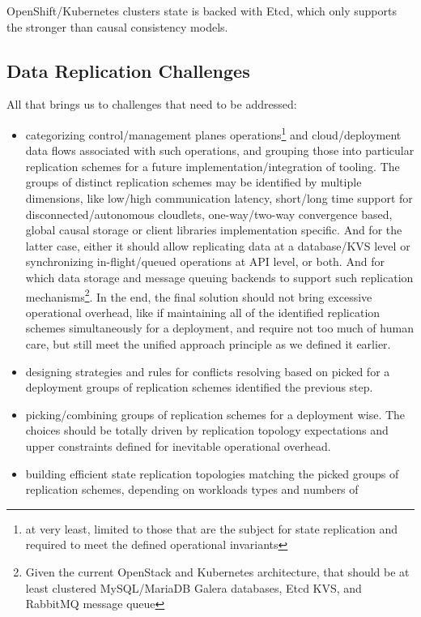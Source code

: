 \documentclass[conference]{IEEEtran}
\begin{document}
OpenShift/Kubernetes clusters state is backed with Etcd, which only supports
the stronger than causal consistency models.

\subsection{Data Replication Challenges}

All that brings us to challenges that need to be addressed:
\begin{itemize}
  \item categorizing control/management planes operations\footnote{at very
    least, limited to those that are the subject for state replication and
    required to meet the defined operational invariants} and cloud/deployment
    data flows associated with such operations, and grouping those into
    particular replication schemes for a future implementation/integration of
    tooling. The groups of distinct replication schemes may be identified by
    multiple dimensions, like low/high communication latency, short/long time
    support for disconnected/autonomous cloudlets, one-way/two-way convergence
    based, global causal storage or client libraries implementation specific.
    And for the latter case, either it should allow replicating data at a
    database/KVS level or synchronizing in-flight/queued operations at API
    level, or both. And for which data storage and message queuing backends to
    support such replication mechanisms\footnote{Given the current OpenStack
    and Kubernetes architecture, that should be at least clustered
    MySQL/MariaDB Galera databases, Etcd KVS, and RabbitMQ message queue}. In
    the end, the final solution should not bring excessive operational
    overhead, like if maintaining all of the identified replication schemes
    simultaneously for a deployment, and require not too much of human care,
    but still meet the unified approach principle as we defined it earlier.
  \item designing strategies and rules for conflicts resolving based on picked
    for a deployment groups of replication schemes identified the previous step.
  \item picking/combining groups of replication schemes for a deployment wise.
    The choices should be totally driven by replication topology expectations
    and upper constraints defined for inevitable operational overhead.
  \item building efficient state replication topologies matching the picked
    groups of replication schemes, depending on workloads types and numbers of

\end{itemize}
\end{document}
